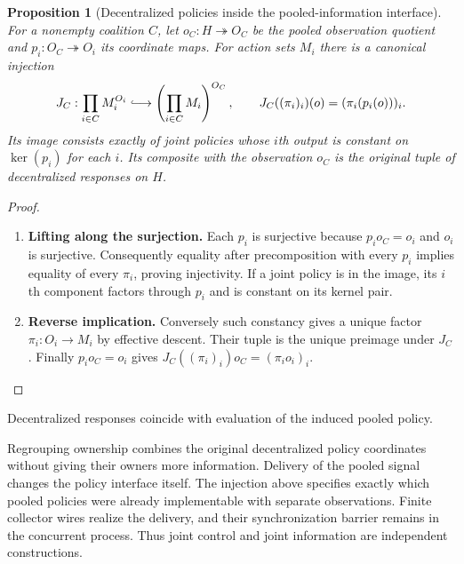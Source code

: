 \documentclass[11pt,a4paper]{article}
\numberwithin{equation}{section}
\newtheorem{proposition}[theorem]{Proposition}
\theoremstyle{definition}
\theoremstyle{remark}
\theoremstyle{plain}
\begin{document}
\begin{proposition}[Decentralized policies inside the pooled-information interface]
\label{prop:egt-pooled-policy-comparison}
For a nonempty coalition $C$, let
$o_C:H\twoheadrightarrow O_C$ be the pooled observation quotient and
$p_i:O_C\twoheadrightarrow O_i$ its coordinate maps. For action sets $M_i$
there is a canonical injection
\[
 J_C:\prod_{i\in C}M_i^{O_i}
      \lhook\joinrel\longrightarrow
      \left(\prod_{i\in C}M_i\right)^{O_C},
 \qquad
 J_C((\pi_i)_i)(o)=(\pi_i(p_i(o)))_i.
\]
Its image consists exactly of joint policies whose $i$th output is constant
on $\ker(p_i)$ for each $i$. Its composite with the observation $o_C$ is the
original tuple of decentralized responses on $H$.
\end{proposition}
\begin{proof}
\leavevmode
\begin{enumerate}[label=\textup{(\arabic*)},leftmargin=*,itemsep=4pt,topsep=3pt]
  \item \textbf{Lifting along the surjection.} Each $p_i$ is surjective because $p_io_C=o_i$ and $o_i$ is surjective. Consequently equality after precomposition with every $p_i$ implies equality
of every $\pi_i$, proving injectivity. If a joint policy is in the image,
its $i$th component factors through $p_i$ and is constant on its kernel pair.
  \item \textbf{Reverse implication.} Conversely such constancy gives a unique factor $\pi_i:O_i\to M_i$ by
effective descent. Their tuple is the unique preimage under $J_C$. Finally $p_io_C=o_i$ gives
$J_C((\pi_i)_i)o_C=(\pi_io_i)_i$.
\end{enumerate}
\end{proof}

\noindent Decentralized responses coincide with evaluation of the induced pooled policy.
\begin{center}
\end{center}

Regrouping ownership combines the original decentralized policy
coordinates without giving their owners more information. Delivery of
the pooled signal changes the policy interface itself. The injection
above specifies exactly which pooled policies were already implementable
with separate observations. Finite collector wires realize the delivery,
and their synchronization barrier remains in the concurrent process.
Thus joint control and joint information are independent constructions.
\end{document}
